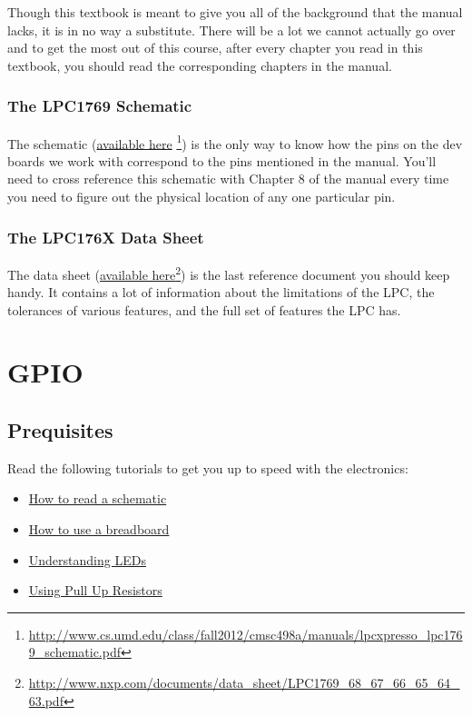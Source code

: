 \documentclass[]{article}
\begin{document}
Though this textbook is meant to give you all of the background that the
manual lacks, it is in no way a substitute. There will be a lot we
cannot actually go over and to get the most out of this course, after
every chapter you read in this textbook, you should read the
corresponding chapters in the manual.

\subsubsection{The LPC1769 Schematic}

The schematic
(\href{http://www.cs.umd.edu/class/fall2012/cmsc498a/manuals/lpcxpresso_lpc1769_schematic.pdf}{available
here} \footnote{\url{http://www.cs.umd.edu/class/fall2012/cmsc498a/manuals/lpcxpresso_lpc1769_schematic.pdf}})
is the only way to know how the pins on the dev boards we work with
correspond to the pins mentioned in the manual. You'll need to cross
reference this schematic with Chapter 8 of the manual every time you
need to figure out the physical location of any one particular pin.

\subsubsection{The LPC176X Data Sheet}

The data sheet
(\href{http://www.nxp.com/documents/data_sheet/LPC1769_68_67_66_65_64_63.pdf}{available
here}\footnote{\url{http://www.nxp.com/documents/data_sheet/LPC1769_68_67_66_65_64_63.pdf}})
is the last reference document you should keep handy. It contains a lot
of information about the limitations of the LPC, the tolerances of
various features, and the full set of features the LPC has.

\newpage

\section{GPIO}

\subsection{Prequisites}

Read the following tutorials to get you up to speed with the
electronics:

\begin{itemize}
\itemsep1pt\parskip0pt
\item
  \href{https://learn.sparkfun.com/tutorials/how-to-read-a-schematic}{How
  to read a schematic}
\item
  \href{https://learn.sparkfun.com/tutorials/how-to-use-a-breadboard/introduction}{How
  to use a breadboard}
\item
  \href{https://learn.sparkfun.com/tutorials/light-emitting-diodes-leds}{Understanding
  LEDs}
\item
  \href{https://learn.sparkfun.com/tutorials/pull-up-resistors/introduction}{Using
  Pull Up Resistors}
\end{itemize}
\end{document}
